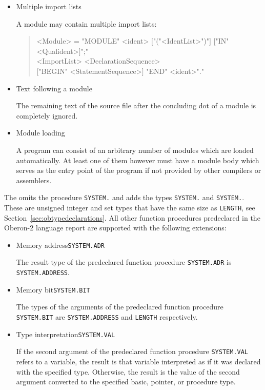 \begin{itemize}
\item Multiple import lists

A module may contain multiple import lists:

\begin{quote}\begin{grammar}
<Module> = "MODULE" <ident> $[$"("<IdentList>")"$]$ $[$"IN" <Qualident>$]$";" \\ \changed{$\{$}<ImportList>\changed{$\}$} <DeclarationSequence> \\ $[$"BEGIN" <StatementSequence>$]$ "END" <ident>"." \par
\end{grammar}\end{quote}

\item Text following a module

The remaining text of the source file after the concluding dot of a module is completely ignored.

\item Module loading

A program can consist of an arbitrary number of modules which are loaded automatically.
At least one of them however must have a module body which serves as the entry point of the program if not provided by other compilers or assemblers.

\end{itemize}

\label{sec:obsystemmodule}

The \ecs{} omits the procedure \texttt{SYSTEM.} and adds the types \texttt{SYSTEM.} and \texttt{SYSTEM.}.
These are unsigned integer and set types that have the same size as \texttt{LENGTH}, see Section~\ref{sec:obtypedeclarations}.
All other function procedures predeclared in the Oberon-2 language report are supported with the following extensions:

\begin{itemize}

\item Memory address\alignright\texttt{SYSTEM.ADR}\nopagebreak

The result type of the predeclared function procedure \texttt{SYSTEM.ADR} is \texttt{SYSTEM.AD\-DRESS}.

\item Memory bit\alignright\texttt{SYSTEM.BIT}\nopagebreak

The types of the arguments of the predeclared function procedure \texttt{SYSTEM.BIT} are \texttt{SYSTEM.AD\-DRESS} and \texttt{LENGTH} respectively.

\item Type interpretation\alignright\texttt{SYSTEM.VAL}\nopagebreak

If the second argument of the predeclared function procedure \texttt{SYSTEM.VAL} refers to a variable, the result is that variable interpreted as if it was declared with the specified type.
Otherwise, the result is the value of the second argument converted to the specified basic, pointer, or procedure type.

\end{itemize}

